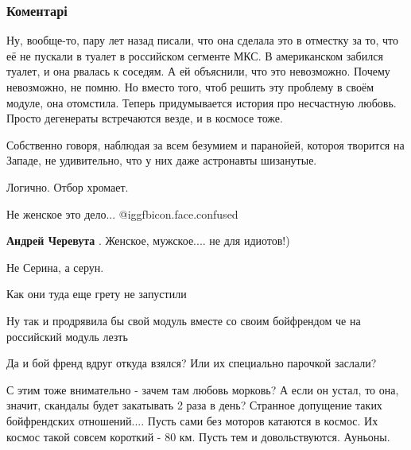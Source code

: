  
 
 
 
 
\subsubsection{Коментарі}

\begin{itemize} %

Ну, вообще-то, пару лет назад писали, что она сделала это в отместку за то, что
её не пускали в туалет в российском сегменте МКС. В американском забился
туалет, и она рвалась к соседям. А ей объяснили, что это невозможно. Почему
невозможно, не помню. Но вместо того, чтоб решить эту проблему в своём модуле,
она отомстила. Теперь придумывается история про несчастную любовь. Просто
дегенераты встречаются везде, и в космосе тоже.


Собственно говоря, наблюдая за всем безумием и паранойей, котороя творится на
Западе, не удивительно, что у них даже астронавты шизанутые.

Логично. Отбор хромает.

Не женское это дело... @igg{fbicon.face.confused} 

\textbf{Андрей Черевута} . Женское, мужское.... не для идиотов!)

Не Серина, а серун.

Как они туда еще грету не запустили

Ну так и продрявила бы свой модуль вместе со своим бойфрендом че на российский модуль лезть

Да и бой френд вдруг откуда взялся? Или их специально парочкой заслали?

С этим тоже внимательно - зачем там любовь морковь? А если он устал, то она, значит, скандалы будет закатывать 2 раза в день?
Странное допущение таких бойфрендских отношений....
Пусть сами без моторов катаются в космос.
Их космос такой совсем короткий - 80 км. Пусть тем и довольствуются. Ауньоны.


\end{itemize}
